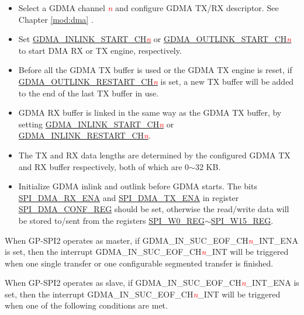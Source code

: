 \documentclass[main\_\_EN.tex]{subfiles}
\begin{document}
\begin{itemize}
    \item Select a GDMA channel \textcolor{red}{\it{n}} and configure GDMA TX/RX descriptor. See Chapter \ref{mod:dma} \textit{}.
    \item Set \hyperref[fielddesc:GDMAINLINKSTARTCHN]{GDMA\_INLINK\_START\_CH\textcolor{red}{\it{n}}} or \hyperref[fielddesc:GDMAOUTLINKSTARTCHN]{GDMA\_OUTLINK\_START\_CH\textcolor{red}{\it{n}}} to start DMA RX or TX engine, respectively.
    \item Before all the GDMA TX buffer is used or the GDMA TX engine is reset, if \hyperref[fielddesc:GDMAOUTLINKRESTARTCHN]{GDMA\_OUTLINK\_RESTART\_CH\textcolor{red}{\it{n}}} is set, a new TX buffer will be added to the end of the last TX buffer in use.
    \item GDMA RX buffer is linked in the same way as the GDMA TX buffer, by setting \hyperref[fielddesc:GDMAINLINKSTARTCHN]{GDMA\_INLINK\_START\_CH\textcolor{red}{\it{n}}} or \hyperref[fielddesc:GDMAINLINKRESTARTCHN]{GDMA\_INLINK\_RESTART\_CH\textcolor{red}{\it{n}}}.
    \item The TX and RX data lengths are determined by the configured GDMA TX and RX buffer respectively, both of which are 0$\sim$32 KB.
    \item Initialize GDMA inlink and outlink before GDMA starts. The bits \hyperref[fielddesc:SPIDMARXENA]{SPI\_DMA\_RX\_ENA} and \hyperref[fielddesc:SPIDMATXENA]{SPI\_DMA\_TX\_ENA} in register \hyperref[regdesc:SPIDMACONFREG]{SPI\_DMA\_CONF\_REG} should be set, otherwise the read/write data will be stored to/sent from the registers \hyperref[regdesc:SPIW0REG]{SPI\_W0\_REG}$\sim$\hyperref[regdesc:SPIW15REG]{SPI\_W15\_REG}.
\end{itemize}

When GP-SPI2 operates as master, if GDMA\_IN\_SUC\_EOF\_CH\textcolor{red}{\it{n}}\_INT\_ENA is set, then the interrupt GDMA\_IN\_SUC\_EOF\_CH\textcolor{red}{\it{n}}\_INT will be triggered when one single transfer or one configurable segmented transfer is finished.

When GP-SPI2 operates as slave, if GDMA\_IN\_SUC\_EOF\_CH\textcolor{red}{\it{n}}\_INT\_ENA is set, then the interrupt GDMA\_IN\_SUC\_EOF\_CH\textcolor{red}{\it{n}}\_INT will be triggered when one of the following conditions are met.
\end{document}
